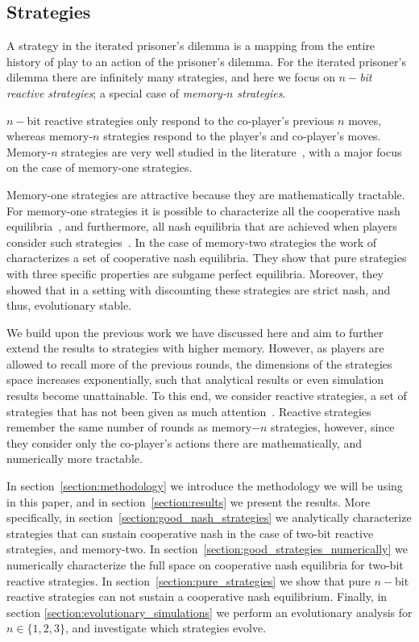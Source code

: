 \documentclass{article}
\theoremstyle{definition}
\begin{document}
\subsection{Strategies}

A strategy in the iterated prisoner's dilemma is a mapping from the entire history of
play to an action of the prisoner's dilemma. For the iterated prisoner's dilemma
there are infinitely many strategies, and here we focus on \textit{\(n-\)bit
reactive strategies}; a special case of \textit{memory-\(n\) strategies}.

\(n-\)bit reactive strategies only respond to the co-player's previous \(n\)
moves, whereas memory-\(n\) strategies respond to the player's and co-player's
moves. Memory-\(n\) strategies are very well studied in the
literature~\citep{baek:scientific:2016, hilbe:PNAS:2017,
glynatsi:scientific:2020, press:PNAS:2012, stewart:scientific:2016}, with a major
focus on the case of memory-one strategies.

Memory-one strategies are attractive because they are mathematically tractable.
For memory-one strategies it is possible to characterize all the cooperative
nash equilibria~\citep{akin:EGADS:2016}, and furthermore, all nash equilibria
that are achieved when players consider such
strategies~\citep{stewart:scientific:2016}. In the case of memory-two strategies
the work of~\citep{hilbe:PNAS:2017} characterizes a set of cooperative nash equilibria.
They show that pure strategies with three specific properties are
subgame perfect equilibria. Moreover, they showed that in a setting with discounting
these strategies are strict nash, and thus, evolutionary stable.

We build upon the previous work we have discussed here and aim to further extend
the results to strategies with higher memory. However, as players are allowed to
recall more of the previous rounds, the dimensions of the strategies space
increases exponentially, such that analytical results or even simulation results
become unattainable. To this end, we consider reactive strategies,
a set of strategies that has not been given as much attention~\citep{baek:scientific:2016, sigmund:JTB:1989, wahl:JTB:1999}.
Reactive strategies remember
the same number of rounds as memory\(-n\) strategies, however, since they consider
only the co-player's actions there are mathematically, and numerically more
tractable.

In section~\ref{section:methodology} we introduce the methodology we will be
using in this paper, and in section~\ref{section:results} we present the
results. More specifically, in section~\ref{section:good_nash_strategies} we
analytically characterize strategies that can sustain cooperative nash in the
case of two-bit reactive strategies, and memory-two. In
section~\ref{section:good_strategies_numerically} we numerically characterize
the full space on cooperative nash equilibria for two-bit reactive strategies.
In section~\ref{section:pure_strategies} we show that pure \(n-\)bit reactive
strategies can not sustain a cooperative nash equilibrium. Finally, in section
\ref{section:evolutionary_simulations} we perform an evolutionary analysis for
\(n \in \{1, 2, 3\}\), and investigate which strategies evolve.
\end{document}
